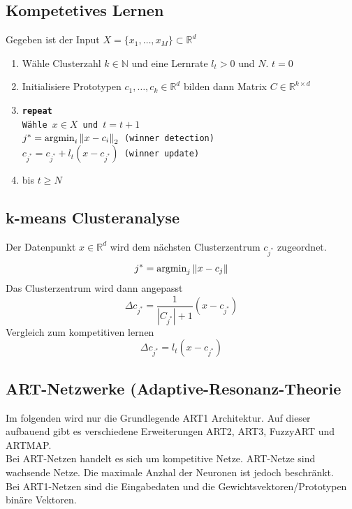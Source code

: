 \subsection{Kompetetives Lernen}
Gegeben ist der Input $X = \{x_1,\dots,x_M\}\subset \mathbb{R}^d$
\begin{enumerate}
    \item Wähle Clusterzahl $k\in\mathbb{N}$ und eine Lernrate $l_t>0$ und $N$. $t=0$
    \item Initialisiere Prototypen $c_1,\dots,c_k\in\mathbb{R}^d$ bilden dann Matrix $C\in\mathbb{R}^{k\times d}$
    \item \texttt{\textbf{repeat}\\
        Wähle $x\in X$ und $t=t+1$\\
        $j^* = \operatorname{argmin}_i\left\lVert x-c_i\right\rVert_2$ (winner detection)\\
        $c_{j^*} = c_{j^*} + l_t(x-c_{j^*})$ (winner update)}
    \item bis $t\geq N$
\end{enumerate}


\subsection{k-means Clusteranalyse}
Der Datenpunkt $x\in\mathbb{R}^d$ wird dem nächsten Clusterzentrum $c_{j^*}$ zugeordnet.
\begin{equation*}
    j^* = \operatorname{argmin}_j\left\lVert x-c_j\right\rVert
\end{equation*}
Das Clusterzentrum wird dann angepasst
\begin{equation*}
    \Delta c_{j^*} = \frac{1}{|C_{j^*}|+1}(x-c_{j^*})
\end{equation*}
Vergleich zum kompetitiven lernen
\begin{equation*}
    \Delta c_{j^*} = l_t(x-c_{j^*})
\end{equation*}


\subsection{ART-Netzwerke (Adaptive-Resonanz-Theorie}
Im folgenden wird nur die Grundlegende ART1 Architektur. Auf dieser aufbauend gibt es verschiedene Erweiterungen ART2, ART3, FuzzyART und ARTMAP.\\
Bei ART-Netzen handelt es sich um kompetitive Netze. ART-Netze sind wachsende Netze. Die maximale Anzhal der Neuronen ist jedoch beschränkt.\\
Bei ART1-Netzen sind die Eingabedaten und die Gewichtsvektoren/Prototypen binäre Vektoren.


